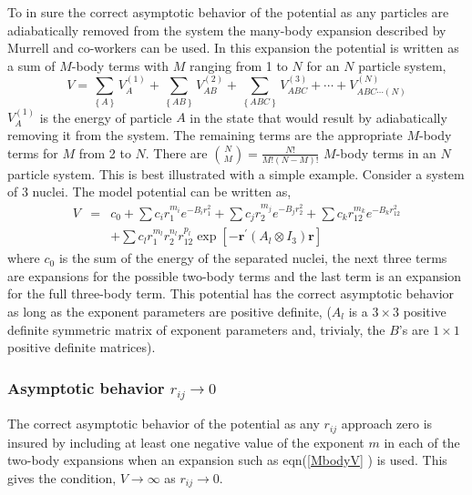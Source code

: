 \documentclass[12pt,thmsa]{article}
\begin{document}
To in sure the correct asymptotic behavior of the potential as any particles
are adiabatically removed from the system the many-body expansion described
by Murrell and co-workers\cite{Murrell84} can be used. In this expansion the
potential is written as a sum of $M$-body terms with $M$ ranging from 1 to $%
N $ for an $N$ particle system, 
\begin{equation}
V=\sum_{\left\{ A\right\} }V_A^{\left( 1\right) }+\sum_{\left\{ AB\right\}
}V_{AB}^{\left( 2\right) }+\sum_{\left\{ ABC\right\} }V_{ABC}^{\left(
3\right) }+\cdots +V_{ABC\cdots \left( N\right) }^{\left( N\right) }
\end{equation}
$V_A^{\left( 1\right) }$ is the energy of particle $A$ in the state that
would result by adiabatically removing it from the system. The remaining
terms are the appropriate $M$-body terms for $M$ from 2 to $N$. There are $%
\binom NM=\frac{N!}{M!\left( N-M\right) !}$ $M$-body terms in an $N$
particle system. This is best illustrated with a simple example. Consider a
system of 3 nuclei. The model potential can be written as, 
\begin{eqnarray}
V &=&c_0+\sum c_ir_1^{m_i}e^{-B_ir_1^2}+\sum c_jr_2^{m_j}e^{-B_jr_2^2}+\sum
c_kr_{12}^{m_k}e^{-B_kr_{12}^2}  \nonumber \\
&&+\sum c_lr_1^{m_l}r_2^{n_l}r_{12}^{p_l}\exp \left[ -\mathbf{r}^{\prime
}\left( A_l\otimes I_3\right) \mathbf{r}\right]  \label{MbodyV}
\end{eqnarray}
where $c_0$ is the sum of the energy of the separated nuclei, the next three
terms are expansions for the possible two-body terms and the last term is an
expansion for the full three-body term. This potential has the correct
asymptotic behavior as long as the exponent parameters are positive
definite, ($A_l$ is a $3\times 3$ positive definite symmetric matrix of
exponent parameters and, trivialy, the $B$'s are $1\times 1$ positive
definite matrices).

\subsubsection{Asymptotic behavior $r_{ij}\rightarrow 0$}

The correct asymptotic behavior of the potential as any $r_{ij}$ approach
zero is insured by including at least one negative value of the exponent $m$
in each of the two-body expansions when an expansion such as eqn(\ref{MbodyV}%
) is used. This gives the condition, $V\rightarrow \infty $ as $%
r_{ij}\rightarrow 0.$
\end{document}
